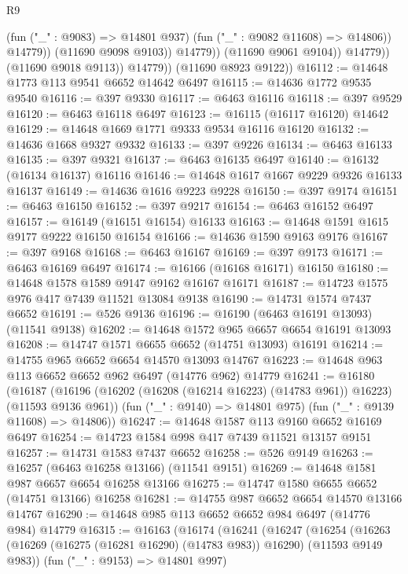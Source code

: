 \begin{lexlean}{R9}
\begin{coremodule}
                              (fun ("_" : @9083) => @14801 @937)
                              (fun ("_" : @9082 @11608) => @14806))
                            @14779))
                        (@11690 @9098 @9103))
                      @14779))
                  (@11690 @9061 @9104))
                @14779))
            (@11690 @9018 @9113))
          @14779))
      (@11690 @8923 @9122))
@16112 := @14648 @1773 @113 @9541 @6652 @14642 @6497
@16115 := @14636 @1772 @9535 @9540
@16116 := @397 @9330
@16117 := @6463 @16116
@16118 := @397 @9529
@16120 := @6463 @16118 @6497
@16123 := @16115 (@16117 @16120) @14642
@16129 := @14648 @1669 @1771 @9333 @9534 @16116 @16120
@16132 := @14636 @1668 @9327 @9332
@16133 := @397 @9226
@16134 := @6463 @16133
@16135 := @397 @9321
@16137 := @6463 @16135 @6497
@16140 := @16132 (@16134 @16137) @16116
@16146 := @14648 @1617 @1667 @9229 @9326 @16133 @16137
@16149 := @14636 @1616 @9223 @9228
@16150 := @397 @9174
@16151 := @6463 @16150
@16152 := @397 @9217
@16154 := @6463 @16152 @6497
@16157 := @16149 (@16151 @16154) @16133
@16163 := @14648 @1591 @1615 @9177 @9222 @16150 @16154
@16166 := @14636 @1590 @9163 @9176
@16167 := @397 @9168
@16168 := @6463 @16167
@16169 := @397 @9173
@16171 := @6463 @16169 @6497
@16174 := @16166 (@16168 @16171) @16150
@16180 := @14648 @1578 @1589 @9147 @9162 @16167 @16171
@16187 := @14723 @1575 @976 @417 @7439 @11521 @13084 @9138
@16190 := @14731 @1574 @7437 @6652
@16191 := @526 @9136
@16196 := @16190 (@6463 @16191 @13093) (@11541 @9138)
@16202 := @14648 @1572 @965 @6657 @6654 @16191 @13093
@16208 := @14747 @1571 @6655 @6652 (@14751 @13093) @16191
@16214 := @14755 @965 @6652 @6654 @14570 @13093 @14767
@16223 := @14648 @963 @113 @6652 @6652 @962 @6497 (@14776 @962) @14779
@16241 := @16180
    (@16187
      (@16196 (@16202 (@16208 (@16214 @16223) (@14783 @961)) @16223) (@11593 @9136 @961))
      (fun ("_" : @9140) => @14801 @975)
      (fun ("_" : @9139 @11608) => @14806))
@16247 := @14648 @1587 @113 @9160 @6652 @16169 @6497
@16254 := @14723 @1584 @998 @417 @7439 @11521 @13157 @9151
@16257 := @14731 @1583 @7437 @6652
@16258 := @526 @9149
@16263 := @16257 (@6463 @16258 @13166) (@11541 @9151)
@16269 := @14648 @1581 @987 @6657 @6654 @16258 @13166
@16275 := @14747 @1580 @6655 @6652 (@14751 @13166) @16258
@16281 := @14755 @987 @6652 @6654 @14570 @13166 @14767
@16290 := @14648 @985 @113 @6652 @6652 @984 @6497 (@14776 @984) @14779
@16315 := @16163
    (@16174
      (@16241
        (@16247
          (@16254
            (@16263 (@16269 (@16275 (@16281 @16290) (@14783 @983)) @16290) (@11593 @9149 @983))
            (fun ("_" : @9153) => @14801 @997)

\end{coremodule}
\end{lexlean}
